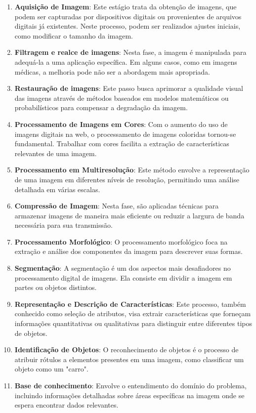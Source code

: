 \begin{enumerate}
    \item \textbf{Aquisição de Imagem}: Este estágio trata da obtenção de imagens, que podem ser capturadas por dispositivos digitais ou provenientes de arquivos digitais já existentes. Neste processo, podem ser realizados ajustes iniciais, como modificar o tamanho da imagem.
    
    \item \textbf{Filtragem e realce de imagens}: Nesta fase, a imagem é manipulada para adequá-la a uma aplicação específica. Em alguns casos, como em imagens médicas, a melhoria pode não ser a abordagem mais apropriada.

    \item \textbf{Restauração de imagens}: Este passo busca aprimorar a qualidade visual das imagens através de métodos baseados em modelos matemáticos ou probabilísticos para compensar a degradação da imagem.

    \item \textbf{Processamento de Imagens em Cores}: Com o aumento do uso de imagens digitais na web, o processamento de imagens coloridas tornou-se fundamental. Trabalhar com cores facilita a extração de características relevantes de uma imagem.

    \item \textbf{Processamento em Multiresolução}: Este método envolve a representação de uma imagem em diferentes níveis de resolução, permitindo uma análise detalhada em várias escalas.

    \item \textbf{Compressão de Imagem}: Nesta fase, são aplicadas técnicas para armazenar imagens de maneira mais eficiente ou reduzir a largura de banda necessária para sua transmissão.

    \item \textbf{Processamento Morfológico}: O processamento morfológico foca na extração e análise dos componentes da imagem para descrever suas formas.

    \item \textbf{Segmentação}: A segmentação é um dos aspectos mais desafiadores no processamento digital de imagens. Ela consiste em dividir a imagem em partes ou objetos distintos.

    \item \textbf{Representação e Descrição de Características}: Este processo, também conhecido como seleção de atributos, visa extrair características que forneçam informações quantitativas ou qualitativas para distinguir entre diferentes tipos de objetos.

    \item \textbf{Identificação de Objetos}: O reconhecimento de objetos é o processo de atribuir rótulos a elementos presentes em uma imagem, como classificar um objeto como um "carro".

    \item \textbf{Base de conhecimento}: Envolve o entendimento do domínio do problema, incluindo informações detalhadas sobre áreas específicas na imagem onde se espera encontrar dados relevantes.

    
\end{enumerate}

